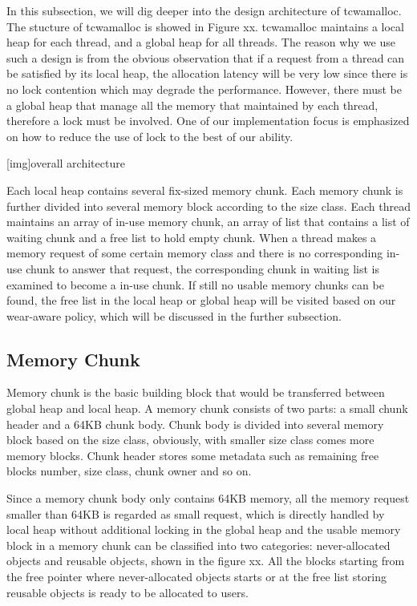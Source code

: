 \documentclass{vldb}
\begin{document}
In this subsection, we will dig deeper into the design architecture of tcwamalloc.
The stucture of tcwamalloc is showed in Figure xx.
tcwamalloc maintains a local heap for each thread, and a global heap for all threads.
The reason why we use such a design is from the obvious observation that if a request from a thread can be satisfied by its local heap,
the allocation latency will be very low since there is no lock contention which may degrade the performance.
However, there must be a global heap that manage all the memory that maintained by each thread,
therefore a lock must be involved. One of our implementation focus is emphasized on how to reduce the use of lock to the best of our ability.

[img]overall architecture

Each local heap contains several fix-sized memory chunk.
Each memory chunk is further divided into several memory block according to the size class.
Each thread maintains an array of in-use memory chunk, an array of list that contains a list of waiting chunk and a free list to hold empty chunk.
When a thread makes a memory request of some certain memory class and there is no corresponding in-use chunk to answer that request,
the corresponding chunk in waiting list is examined to become a in-use chunk. 
If still no usable memory chunks can be found,
the free list in the local heap or global heap will be visited based on our wear-aware policy,
which will be discussed in the further subsection.

\subsection{Memory Chunk}

Memory chunk is the basic building block that would be transferred between global heap and local heap. 
A memory chunk consists of two parts: a small chunk header and a 64KB chunk body. 
Chunk body is divided into several memory block based on the size class,
obviously, with smaller size class comes more memory blocks. 
Chunk header stores some metadata such as remaining free blocks number, size class, chunk owner and so on.

Since a memory chunk body only contains 64KB memory, all the memory request smaller than 64KB is regarded as small request,
which is directly handled by local heap without additional locking in the global heap and 
the usable memory block in a memory chunk can be classified into two categories: never-allocated objects and reusable objects,
shown in the figure xx. 
All the blocks starting from the free pointer where never-allocated objects starts or at the free list storing reusable objects is ready to be allocated to users.
\end{document}
